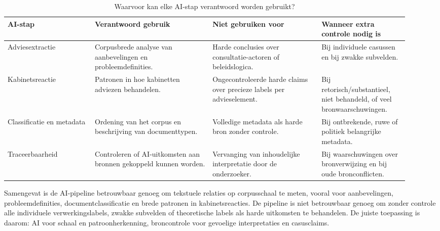\begin{table}[htbp]
\centering
\small
\caption{Waarvoor kan elke AI-stap verantwoord worden gebruikt?}
\label{tab:dv2-eindoordeel}
\begin{tabular}{p{0.20\linewidth}p{0.27\linewidth}p{0.25\linewidth}p{0.20\linewidth}}
\hline
AI-stap & Verantwoord gebruik & Niet gebruiken voor & Wanneer extra controle nodig is \\
\hline
Adviesextractie & Corpusbrede analyse van aanbevelingen en probleemdefinities. & Harde conclusies over consultatie-actoren of beleidslogica. & Bij individuele casussen en bij zwakke subvelden. \\
Kabinetsreactie & Patronen in hoe kabinetten adviezen behandelen. & Ongecontroleerde harde claims over precieze labels per advieselement. & Bij retorisch/substantieel, niet behandeld, of veel bronwaarschuwingen. \\
Classificatie en metadata & Ordening van het corpus en beschrijving van documenttypen. & Volledige metadata als harde bron zonder controle. & Bij ontbrekende, ruwe of politiek belangrijke metadata. \\
Traceerbaarheid & Controleren of AI-uitkomsten aan bronnen gekoppeld kunnen worden. & Vervanging van inhoudelijke interpretatie door de onderzoeker. & Bij waarschuwingen over bronverwijzing en bij oude bronconflicten. \\
\hline
\end{tabular}
\end{table}

Samengevat is de AI-pipeline betrouwbaar genoeg om tekstuele relaties op corpusschaal te meten, vooral voor aanbevelingen, probleemdefinities, documentclassificatie en brede patronen in kabinetsreacties. De pipeline is niet betrouwbaar genoeg om zonder controle alle individuele verwerkingslabels, zwakke subvelden of theoretische labels als harde uitkomsten te behandelen. De juiste toepassing is daarom: AI voor schaal en patroonherkenning, broncontrole voor gevoelige interpretaties en casusclaims.
